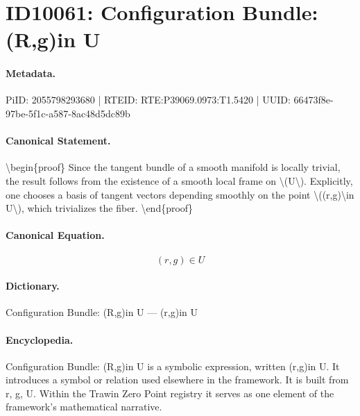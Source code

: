\section*{ID10061: Configuration Bundle: (R,g)in U}
\paragraph{Metadata.}
PiID: 2055798293680 | RTEID: RTE:P39069.0973:T1.5420 | UUID: 66473f8e-97be-5f1c-a587-8ac48d5dc89b

\paragraph{Canonical Statement.}
\textbackslash{}begin\{proof\} Since the tangent bundle of a smooth manifold is locally trivial, the result follows from the existence of a smooth local frame on \textbackslash{}(U\textbackslash{}). Explicitly, one chooses a basis of tangent vectors depending smoothly on the point \textbackslash{}((r,g)\textbackslash{}in U\textbackslash{}), which trivializes the fiber. \textbackslash{}end\{proof\}

\paragraph{Canonical Equation.}
\[
(r,g)\in U
\]

\paragraph{Dictionary.}
Configuration Bundle: (R,g)in U — (r,g)in U

\paragraph{Encyclopedia.}
Configuration Bundle: (R,g)in U is a symbolic expression, written (r,g)in U. It introduces a symbol or relation used elsewhere in the framework. It is built from r, g, U. Within the Trawin Zero Point registry it serves as one element of the framework's mathematical narrative.
